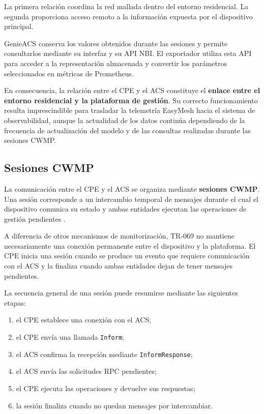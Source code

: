 La primera relación coordina la red mallada dentro del entorno
residencial. La segunda proporciona acceso remoto a la información
expuesta por el dispositivo principal.

GenieACS conserva los valores obtenidos durante las sesiones y permite
consultarlos mediante su interfaz y su API NBI. El exportador utiliza
esta API para acceder a la representación almacenada y convertir los
parámetros seleccionados en métricas de Prometheus.

En consecuencia, la relación entre el CPE y el ACS constituye el
\textbf{enlace entre el entorno residencial y la plataforma de gestión}.
Su correcto funcionamiento resulta imprescindible para trasladar la
telemetría EasyMesh hacia el sistema de observabilidad, aunque la
actualidad de los datos continúa dependiendo de la frecuencia de
actualización del modelo y de las consultas realizadas durante las
sesiones CWMP.

\subsection{Sesiones CWMP}
\label{subsec:sesiones-cwmp}

La comunicación entre el CPE y el ACS se organiza mediante
\textbf{sesiones CWMP}. Una sesión corresponde a un intercambio temporal
de mensajes durante el cual el dispositivo comunica su estado y ambas
entidades ejecutan las operaciones de gestión pendientes
\cite{bbf_tr069}.

A diferencia de otros mecanismos de monitorización, TR-069 no mantiene
necesariamente una conexión permanente entre el dispositivo y la
plataforma. El CPE inicia una sesión cuando se produce un evento que
requiere comunicación con el ACS y la finaliza cuando ambas entidades
dejan de tener mensajes pendientes.

La secuencia general de una sesión puede resumirse mediante las
siguientes etapas:

\begin{enumerate}
    \item el CPE establece una conexión con el ACS;

    \item el CPE envía una llamada \texttt{Inform};

    \item el ACS confirma la recepción mediante
    \texttt{InformResponse};

    \item el ACS envía las solicitudes RPC pendientes;

    \item el CPE ejecuta las operaciones y devuelve sus respuestas;

    \item la sesión finaliza cuando no quedan mensajes por intercambiar.
\end{enumerate}

